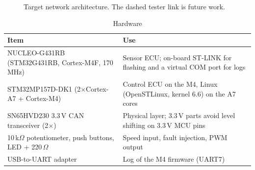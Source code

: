 \begin{figure}[H]
\centering
{}
\caption{Target network architecture. The dashed tester link is future work.}
\label{fig:system}
\end{figure}

\begin{table}[H]
\centering
\small
\caption{Hardware}
\label{tab:hardware}
\begin{tabularx}{\textwidth}{@{}Xp{6.4cm}@{}}
\toprule
\textbf{Item} & \textbf{Use} \\
\midrule
NUCLEO-G431RB (STM32G431RB, Cortex-M4F, 170\,MHz)~\cite{UM2505,RM0440} & Sensor ECU; on-board ST-LINK for flashing and a virtual COM port for logs \\
STM32MP157D-DK1 (2$\times$Cortex-A7 + Cortex-M4)~\cite{UM2637,RM0436} & Control ECU on the M4, Linux (OpenSTLinux, kernel 6.6) on the A7 cores \\
SN65HVD230 3.3\,V CAN transceiver (2$\times$)~\cite{SN65HVD230} & Physical layer; 3.3\,V parts avoid level shifting on 3.3\,V MCU pins \\
10\,k$\Omega$ potentiometer, push buttons, LED + 220\,$\Omega$ & Speed input, fault injection, PWM output \\
USB-to-UART adapter & Log of the M4 firmware (UART7) \\
\bottomrule
\end{tabularx}
\end{table}

